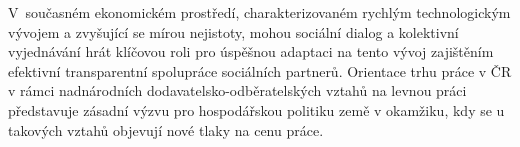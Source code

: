 V~současném ekonomickém prostředí, charakterizovaném rychlým technologickým vývojem a zvyšující se
mírou nejistoty, mohou sociální dialog a kolektivní vyjednávání hrát klíčovou roli pro úspěšnou adaptaci na
tento vývoj zajištěním efektivní transparentní spolupráce sociálních partnerů. Orientace trhu práce v ČR
v rámci nadnárodních dodavatelsko-odběratelských vztahů na levnou práci představuje zásadní výzvu pro
hospodářskou politiku země v okamžiku, kdy se u takových vztahů objevují nové tlaky na cenu práce.